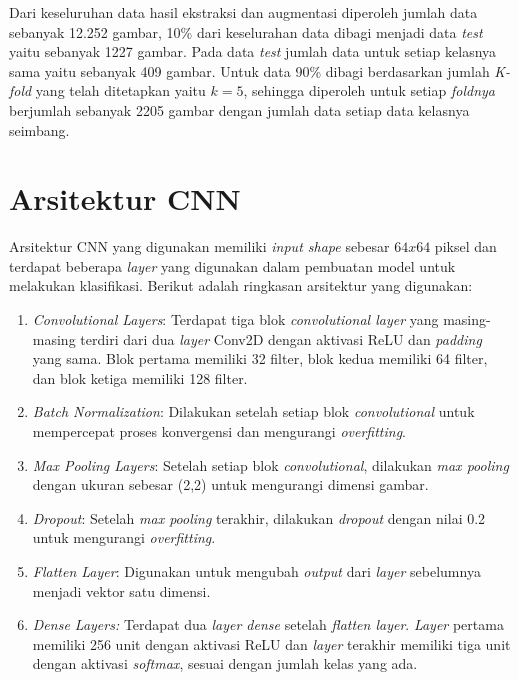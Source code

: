     Dari keseluruhan data hasil ekstraksi dan augmentasi diperoleh jumlah data sebanyak 12.252 gambar, 10\% dari keselurahan data dibagi menjadi data \textit{test} yaitu sebanyak 1227 gambar. Pada data \textit{test} jumlah data untuk setiap kelasnya sama yaitu sebanyak 409 gambar. Untuk data 90\% dibagi berdasarkan jumlah \textit{K-fold} yang telah ditetapkan yaitu $k = 5$, sehingga diperoleh untuk setiap \textit{foldnya} berjumlah sebanyak 2205 gambar dengan jumlah data setiap data kelasnya seimbang.
    



\section{Arsitektur CNN}

    Arsitektur CNN yang digunakan memiliki \textit{input shape} sebesar $ 64 x 64 $ piksel dan terdapat beberapa \textit{layer} yang digunakan dalam pembuatan model untuk melakukan klasifikasi. Berikut adalah ringkasan arsitektur yang digunakan:

    \begin{enumerate}
        \item     \textit{Convolutional Layers}: Terdapat tiga blok \textit{convolutional layer} yang masing-masing terdiri dari dua \textit{layer} Conv2D dengan aktivasi ReLU dan \textit{padding} yang sama. Blok pertama memiliki 32 filter, blok kedua memiliki 64 filter, dan blok ketiga memiliki 128 filter.
    
        \item  \textit{Batch Normalization}: Dilakukan setelah setiap blok \textit{convolutional }untuk mempercepat proses konvergensi dan mengurangi \textit{overfitting}.
    
        \item \textit{Max Pooling Layers}: Setelah setiap blok \textit{convolutional}, dilakukan \textit{max pooling} dengan ukuran sebesar (2,2) untuk mengurangi dimensi gambar.
    
       \item  \textit{Dropout}: Setelah \textit{max pooling} terakhir, dilakukan \textit{dropout} dengan nilai 0.2 untuk mengurangi \textit{overfitting}.
    
        \item \textit{Flatten Layer}: Digunakan untuk mengubah \textit{output} dari \textit{layer} sebelumnya menjadi vektor satu dimensi.
    
        \item \textit{Dense Layers:} Terdapat dua \textit{layer dense} setelah \textit{flatten layer}. \textit{Layer} pertama memiliki 256 unit dengan aktivasi ReLU dan \textit{layer} terakhir memiliki tiga unit dengan aktivasi \textit{softmax}, sesuai dengan jumlah kelas yang ada.

    \end{enumerate}

